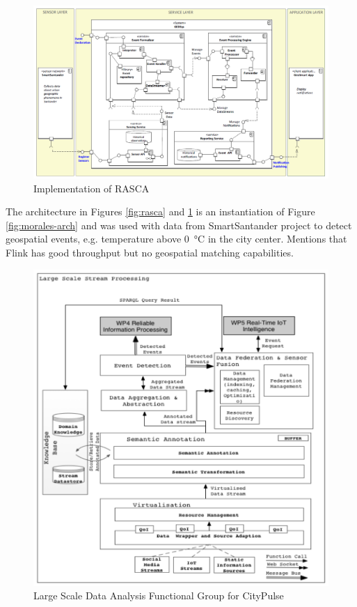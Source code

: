 \documentclass[]{scrartcl}
\begin{document}
\begin{figure}[h]
	\centering
	\includegraphics[width=\textwidth]{Garcia_2019b}
	\caption{Implementation of RASCA~\cite[p.~13]{GarciaAlvarez.2019}}
	\label{fig:rasca-impl}
\end{figure}

The architecture in Figures \ref{fig:rasca} and \ref{fig:rasca-impl} is an instantiation of Figure \ref{fig:morales-arch} and was used with data from SmartSantander project to detect geospatial events, e.g. temperature above \SI{0}{\celsius} in the city center. Mentions that Flink has good throughput but no geospatial matching capabilities. 

\begin{figure}[h]
	\centering
	\includegraphics[width=\textwidth]{Tsiatsis_2015}
	\caption{Large Scale Data Analysis Functional Group for CityPulse~\cite[p.~25]{Tsiatsis.2015}}
	\label{fig:citypulse-streaming}
\end{figure}
\end{document}
